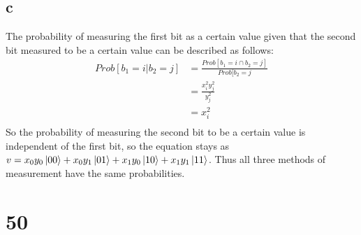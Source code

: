 \documentclass[letterpaper,notitlepage,twoside]{article}
\begin{document}
\subsection*{c}
The probability of measuring the first bit as a certain value given that the second bit measured to be a certain value can be described as follows:
\begin{align*}
Prob[b_1 = i | b_2 = j] &= \frac{Prob[b_1 = i \cap b_2 = j]}{Prob[b_2 = j} \\
&= \frac{x_i^2y_j^2}{y_j^2} \\
&= x_i^2 \\
\end{align*}
So the probability of measuring the second bit to be a certain value is independent of the first bit, so the equation stays as $v = x_0y_0\ket{00} + x_0y_1\ket{01} + x_1y_0\ket{10} + x_1y_1\ket{11}$. Thus all three methods of measurement have the same probabilities.
\section*{50}
\end{document}

